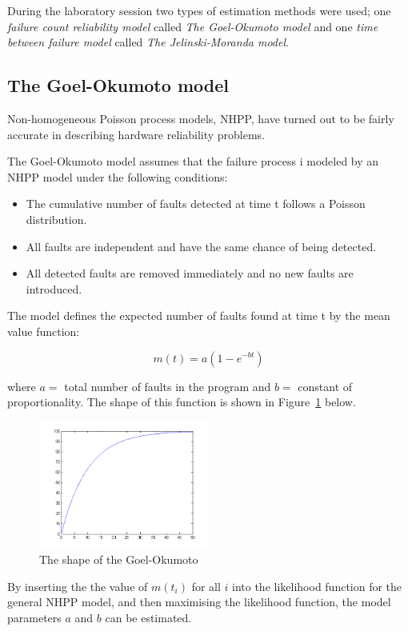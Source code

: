 During the laboratory session two types of estimation methods were used; one \textit{failure count reliability model} called \textit{The Goel-Okumoto model }and one \textit{time between failure model} called \textit{The Jelinski-Moranda model}. 

\subsection{The Goel-Okumoto model}
Non-homogeneous Poisson process models, NHPP, have turned out to be fairly accurate in describing hardware reliability problems. 

The Goel-Okumoto model assumes that the failure process i modeled by an NHPP model under the following conditions:
\begin{itemize}
\item	The cumulative number of faults detected at time t follows a Poisson distribution.
\item	All faults are independent and have the same chance of being detected.
\item 	All detected faults are removed immediately and no new faults are introduced.
\end{itemize}

\noindent The model defines the expected number of faults found at time t by the mean value function:

$$m(t) = a(1 - e^{-bt})$$

\noindent where $a=$ total number of faults in the program and $b=$ constant of proportionality. The shape of this function is shown in Figure~\ref{goelokumoto} below.

\begin{figure}[htb!]
\centering
	\includegraphics[width=0.5\textwidth]{mshape.png}
\caption{The shape of the Goel-Okumoto  }
\label{goelokumoto}
\end{figure}

By inserting the the value of $m(t_{i})$ for all $i$ into the likelihood function for the general NHPP model, and then maximising the likelihood function, the model parameters $a$ and $b$ can be estimated. 

